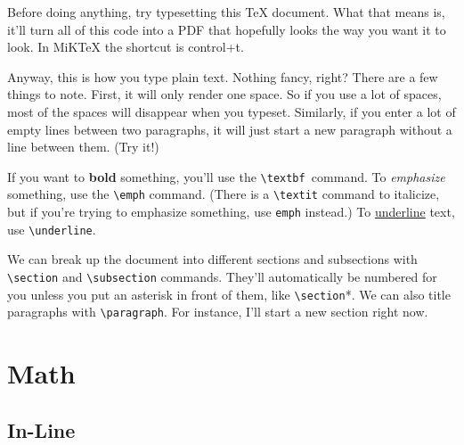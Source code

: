 \documentclass[12pt]{article}
\begin{document}
\maketitle %


Before doing anything, try typesetting this TeX document. What that means is, it'll
turn all of this code into a PDF that hopefully looks the way you want it to look. In
MiKTeX the shortcut is control+t. 

Anyway, this is how you type plain text. Nothing fancy, right? There are a few things
to note. First, it will only render one space. So if you use     a lot of spaces, most of
the spaces will disappear when you typeset. Similarly, if you enter a lot of empty
lines between two paragraphs, it will just start a new paragraph without a line 
between them. (Try it!)

If you want to \textbf{bold} something, you'll use the \verb|\textbf |command. 
To \emph{emphasize} something, use the \verb|\emph| command. (There is 
a \verb|\textit| command to italicize, but if you're trying to emphasize something,
use \verb|emph| instead.) To \underline{underline} text, use \verb|\underline|. 

We can break up the document into different sections and subsections with
\verb|\section| and \verb|\subsection| commands. They'll automatically be
numbered for you unless you put an asterisk in front of them, like \verb|\section|*.
We can also title paragraphs with \verb|\paragraph|. For instance, I'll start a new
section right now.




\section{Math}


\subsection{In-Line}
\end{document}
